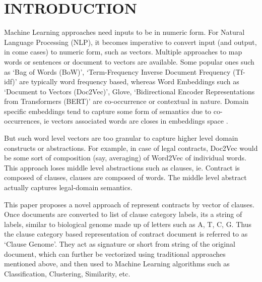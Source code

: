 \documentclass[9pt,academicons]{article}
\begin{document}
%




\section{INTRODUCTION}

Machine Learning approaches need inputs to be in numeric form. For Natural Language Processing (NLP), it becomes imperative 
to convert input (and output, in come cases) to numeric form, such as vectors. Multiple approaches to map words or sentences or document to vectors are available. Some popular ones such as `Bag of Words (BoW)', `Term-Frequency Inverse Document Frequency (Tf-idf)' are typically word frequency based, whereas Word Embeddings such as `Document to Vectors (Doc2Vec)', Glove, `Bidirectional Encoder Representations from Transformers (BERT)' are co-occurrence or contextual in nature. Domain specific embeddings tend to capture some form of semantics due to co-occurrences, ie vectors associated words are closes in embeddings space \cite{Doc2VecSurvey}.

But such word level vectors are too granular to capture higher level domain constructs or abstractions. For example, in case of legal contracts, Doc2Vec would be some sort of composition (say, averaging) of Word2Vec of individual words. This approach loses middle level abstractions such as clauses, ie. Contract is composed of clauses, clauses are composed of words. The middle level abstract actually captures legal-domain semantics.

This paper proposes a novel approach of represent contracts by vector of clauses.
Once documents are converted to list of clause category labels, its a string of labels, similar to biological genome made up of letters such as A, T, C, G. Thus the clause category based representation of contract document is referred to as `Clause Genome'.  They act as signature or short from string of the original document, which can further be vectorized using traditional approaches mentioned above, and then used to Machine Learning algorithms such as Classification, Clustering, Similarity, etc.
\end{document}
